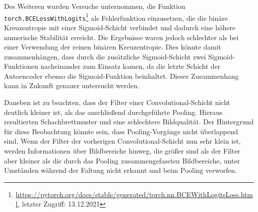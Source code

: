 Des Weiteren wurden Versuche unternommen, die Funktion \texttt{torch.BCELossWithLogits}\footnote{\url{https://pytorch.org/docs/stable/generated/torch.nn.BCEWithLogitsLoss.html}, letzter Zugriff: 13.12.2021} als Fehlerfunktion einzusetzen, die die binäre Kreuzentropie mit einer Sigmoid-Schicht verbindet und dadurch eine höhere numerische Stabilität erreicht. Die Ergebnisse waren jedoch schlechter als bei einer Verwendung der reinen binären Kreuzentropie. Dies könnte damit zusammenhängen, dass durch die zusätzliche Sigmoid-Schicht zwei Sigmoid-Funktionen nacheinander zum Einsatz kamen, da die letzte Schicht der Autoencoder ebenso die Sigmoid-Funktion beinhaltet. Dieser Zusammenhang kann in Zukunft genauer untersucht werden.

Daneben ist zu beachten, dass der Filter einer Convolutional-Schicht nicht deutlich kleiner ist, als das anschließend durchgeführte Pooling.
Hieraus resultierten Schachbrettmuster und eine schlechtere Bildqualität. Der Hintergrund für diese Beobachtung könnte sein, dass Pooling-Vorgänge nicht überlappend sind. Wenn der Filter der vorherigen Convolutional-Schicht nun sehr klein ist, werden Informationen über Bildbereiche hinweg, die größer sind als der Filter aber kleiner als die durch das Pooling zusammengefassten Bildbereiche, unter Umständen während der Faltung nicht erkannt und beim Pooling verworfen.

